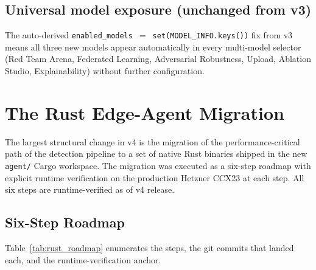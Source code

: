 \documentclass[11pt,a4paper]{article}
\begin{document}
\subsection{Universal model exposure (unchanged from v3)}
The auto-derived \texttt{enabled\_models}~$=$~\texttt{set(MODEL\_INFO.keys())}
fix from v3 means all three new models appear automatically in every
multi-model selector (Red Team Arena, Federated Learning, Adversarial
Robustness, Upload, Ablation Studio, Explainability) without further
configuration.

\section{The Rust Edge-Agent Migration}
\label{sec:rust_agent}

The largest structural change in v4 is the migration of the
performance-critical path of the detection pipeline to a set of
native Rust binaries shipped in the new \texttt{agent/} Cargo
workspace.  The migration was executed as a six-step roadmap with
explicit runtime verification on the production Hetzner CCX23 at
each step.  All six steps are runtime-verified as of v4 release.

\subsection{Six-Step Roadmap}
\label{sec:rust_roadmap}

Table~\ref{tab:rust_roadmap} enumerates the steps, the git commits
that landed each, and the runtime-verification anchor.
\end{document}
